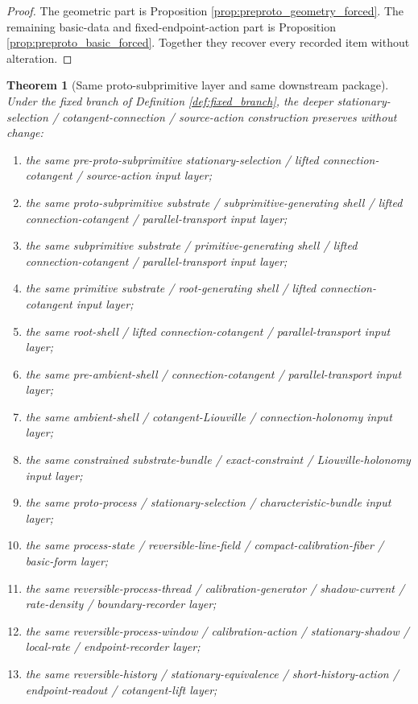 \documentclass[11pt]{article}
\newtheorem{theorem}{Theorem}
\begin{document}
\begin{proof}
The geometric part is Proposition \ref{prop:preproto_geometry_forced}. The remaining basic-data and fixed-endpoint-action part is Proposition \ref{prop:preproto_basic_forced}. Together they recover every recorded item without alteration.
\end{proof}

\begin{theorem}[Same proto-subprimitive layer and same downstream package]
\label{thm:same_package}
Under the fixed branch of Definition \ref{def:fixed_branch}, the deeper stationary-selection / cotangent-connection / source-action construction preserves without change:
\begin{enumerate}
    \item the same pre-proto-subprimitive stationary-selection / lifted connection-cotangent / source-action input layer;
    \item the same proto-subprimitive substrate / subprimitive-generating shell / lifted connection-cotangent / parallel-transport input layer;
    \item the same subprimitive substrate / primitive-generating shell / lifted connection-cotangent / parallel-transport input layer;
    \item the same primitive substrate / root-generating shell / lifted connection-cotangent input layer;
    \item the same root-shell / lifted connection-cotangent / parallel-transport input layer;
    \item the same pre-ambient-shell / connection-cotangent / parallel-transport input layer;
    \item the same ambient-shell / cotangent-Liouville / connection-holonomy input layer;
    \item the same constrained substrate-bundle / exact-constraint / Liouville-holonomy input layer;
    \item the same proto-process / stationary-selection / characteristic-bundle input layer;
    \item the same process-state / reversible-line-field / compact-calibration-fiber / basic-form layer;
    \item the same reversible-process-thread / calibration-generator / shadow-current / rate-density / boundary-recorder layer;
    \item the same reversible-process-window / calibration-action / stationary-shadow / local-rate / endpoint-recorder layer;
    \item the same reversible-history / stationary-equivalence / short-history-action / endpoint-readout / cotangent-lift layer;

\end{enumerate}
\end{theorem}
\end{document}
